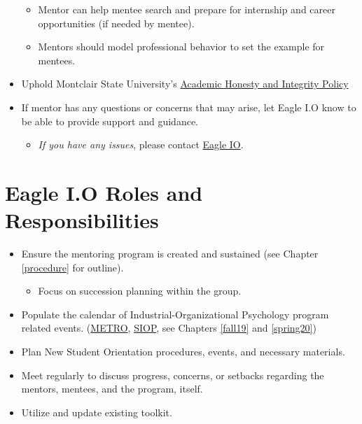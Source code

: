 \documentclass[
  openany]{book}
\providecommand{\tightlist}{%
  \setlength{\itemsep}{0pt}\setlength{\parskip}{0pt}}
\begin{document}
\begin{itemize}
  \begin{itemize}
  \tightlist
  \item
    Mentor can help mentee search and prepare for internship and career opportunities (if needed by mentee).
  \item
    Mentors should model professional behavior to set the example for mentees.
  \end{itemize}
\item
  Uphold Montclair State University's \href{https://www.montclair.edu/policies/all-policies/academic-honesty-and-integrity/}{Academic Honesty and Integrity Policy}
\item
  If mentor has any questions or concerns that may arise, let Eagle I.O know to be able to provide support and guidance.

  \begin{itemize}
  \tightlist
  \item
    \emph{If you have any issues}, please contact \href{mailto:eagleio@montclair.edu}{Eagle IO}.
  \end{itemize}
\end{itemize}

\hypertarget{Eagle}{%
\section{Eagle I.O Roles and Responsibilities}\label{Eagle}}

\begin{itemize}
\tightlist
\item
  Ensure the mentoring program is created and sustained (see Chapter \ref{procedure} for outline).

  \begin{itemize}
  \tightlist
  \item
    Focus on succession planning within the group.
  \end{itemize}
\item
  Populate the calendar of Industrial-Organizational Psychology program related events. (\href{http://www.metroapppsych.com/}{METRO}, \href{http://www.siop.org/}{SIOP}, see Chapters \ref{fall19} and \ref{spring20})\\
\item
  Plan New Student Orientation procedures, events, and necessary materials.
\item
  Meet regularly to discuss progress, concerns, or setbacks regarding the mentors, mentees, and the program, itself.
\item
  Utilize and update existing toolkit.
\end{itemize}
\end{document}
